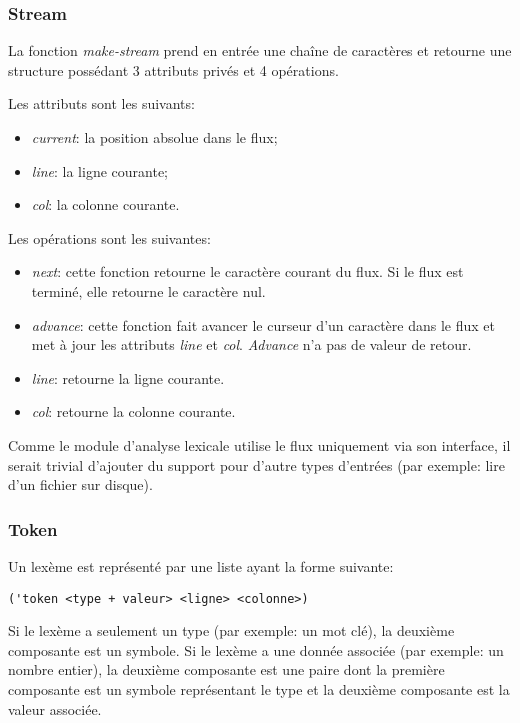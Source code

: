 \documentclass[11pt]{report}
\begin{document}
\subsubsection{Stream}

La fonction \emph{make-stream} prend en entrée une chaîne de
caractères et retourne une structure possédant 3 attributs privés et 4
opérations.

Les attributs sont les suivants:

\begin{itemize}
\item \emph{current}: la position absolue dans le flux;
\item \emph{line}: la ligne courante;
\item \emph{col}: la colonne courante.
\end{itemize}

Les opérations sont les suivantes:

\begin{itemize}
\item \emph{next}: cette fonction retourne le caractère courant du
  flux.  Si le flux est terminé, elle retourne le caractère nul.
\item \emph{advance}: cette fonction fait avancer le curseur d'un
  caractère dans le flux et met à jour les attributs \emph{line} et
  \emph{col}.  \emph{Advance} n'a pas de valeur de retour.
\item \emph{line}: retourne la ligne courante.
\item \emph{col}: retourne la colonne courante.
\end{itemize}

Comme le module d'analyse lexicale utilise le flux uniquement via son
interface, il serait trivial d'ajouter du support pour d'autre types
d'entrées (par exemple: lire d'un fichier sur disque).

\subsubsection{Token}

Un lexème est représenté par une liste ayant la forme suivante:

\begin{verbatim}
('token <type + valeur> <ligne> <colonne>)
\end{verbatim}

Si le lexème a seulement un type (par exemple: un mot clé), la
deuxième composante est un symbole.  Si le lexème a une donnée
associée (par exemple: un nombre entier), la deuxième composante est
une paire dont la première composante est un symbole représentant le
type et la deuxième composante est la valeur associée.
\end{document}
